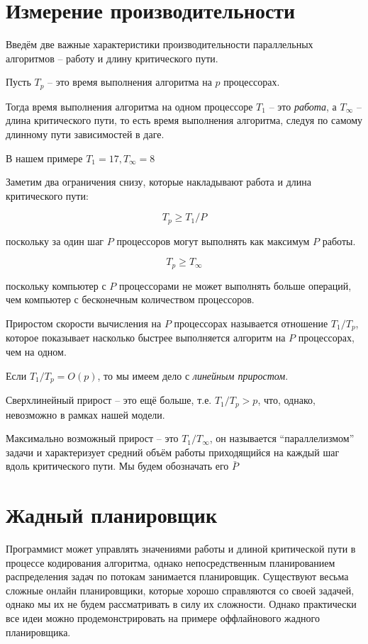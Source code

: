 \documentclass[a4paper,11pt]{article}
\begin{document}
\section{Измерение производительности}

Введём две важные характеристики производительности параллельных алгоритмов --
работу и длину критического пути.

Пусть $T_p$ -- это время выполнения алгоритма на $p$ процессорах.

Тогда время выполнения алгоритма на одном процессоре $T_1$ -- это \emph{работа},
а $T_{\infty}$ -- длина критического пути, то есть время выполнения алгоритма,
следуя по самому длинному пути зависимостей в даге. 

В нашем примере $T_1 = 17, T_{\infty} = 8$

Заметим два ограничения снизу, которые накладывают работа и длина критического
пути:

$$
T_p \geqslant T_1 / P
$$

поскольку за один шаг $P$ процессоров могут выполнять как максимум $P$ работы.

$$
T_p \geqslant T_{\infty}
$$

поскольку компьютер с $P$ процессорами не может выполнять больше операций, чем
компьютер с бесконечным количеством процессоров.

Приростом скорости вычисления на $P$ процессорах называется отношение $T_1 /
T_p$, которое показывает насколько быстрее выполняется алгоритм на $P$
процессорах, чем на одном.

Если $T_1/T_p = O(p)$, то мы имеем дело с \emph{линейным приростом}.

Сверхлинейный прирост -- это ещё больше, т.е. $T_1 / T_p > p$, что, однако,
невозможно в рамках нашей модели.

Максимально возможный прирост -- это $T_1 / T_{\infty}$, он называется
``параллелизмом'' задачи и характеризует средний объём работы приходящийся на
каждый шаг вдоль критического пути. Мы будем обозначать его $\bar{P}$

\section{Жадный планировщик}

Программист может управлять значениями работы и длиной критической пути в
процессе кодирования алгоритма, однако непосредственным планированием
распределения задач по потокам занимается планировщик. Существуют весьма сложные
онлайн планировщики, которые хорошо справляются со своей задачей, однако мы их
не будем рассматривать в силу их сложности. Однако практически все идеи можно
продемонстрировать на примере оффлайнового жадного планировщика.
\end{document}
